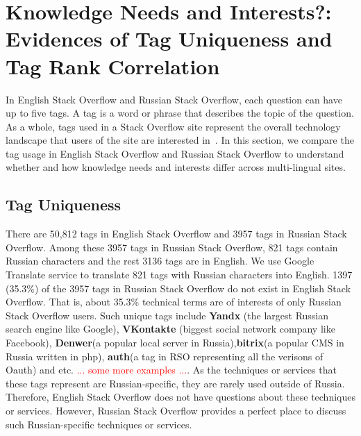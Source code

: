 \section{Knowledge Needs and Interests?: Evidences of Tag Uniqueness and Tag Rank Correlation}

In English Stack Overflow and Russian Stack Overflow, each question can have up to five tags. 
A tag is a word or phrase that describes the topic of the question. 
As a whole, tags used in a Stack Overflow site represent the overall technology landscape that users of the site are interested in~\cite{???ChunyangKG}.
In this section, we compare the tag usage in English Stack Overflow and Russian Stack Overflow to understand whether and how knowledge needs and interests differ across multi-lingual sites.

\subsection{Tag Uniqueness}


There are 50,812 tags in English Stack Overflow and 3957 tags in Russian Stack Overflow. 
Among these 3957 tags in Russian Stack Overflow, 821 tags contain Russian characters and the rest 3136 tags are in English. 
We use Google Translate service to translate 821 tags with Russian characters into English.
1397 (35.3\%) of the 3957 tags in Russian Stack Overflow do not exist in English Stack Overflow.
That is, about 35.3\% technical terms are of interests of only Russian Stack Overflow users.
Such unique tags include \textbf{Yandx} (the largest Russian search engine like Google), \textbf{VKontakte} (biggest social network company like Facebook), \textbf{Denwer}(a popular local server in Russia),\textbf{bitrix}(a popular CMS in Russia written in php), \textbf{auth}(a tag in RSO representing all the verisons of Oauth) and etc. \textcolor{red}{... some more examples ...}.
As the techniques or services that these tags represent are Russian-specific, they are rarely used outside of Russia.
Therefore, English Stack Overflow does not have questions about these techniques or services.
However, Russian Stack Overflow provides a perfect place to discuss such Russian-specific techniques or services.

